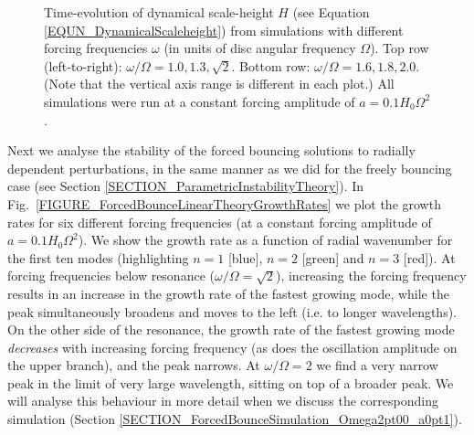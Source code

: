 \documentclass[fleqn,usenatbib]{mnras}
\begin{document}
\begin{figure}
\caption{Time-evolution of dynamical scale-height $H$ (see Equation \ref{EQUN_DynamicalScaleheight}) from simulations with different forcing frequencies $\omega$ (in units of disc angular frequency $\Omega$). Top row (left-to-right): $\omega/\Omega = 1.0, 1.3, \sqrt{2}$. Bottom row: $\omega/\Omega = 1.6, 1.8, 2.0$. (Note that the vertical axis range is different in each plot.) All simulations were run at a constant forcing amplitude of $a = 0.1 H_0\Omega^2$.}
\label{FIGURE_ForcedBounceDynamicalHForcingFrequencies  }
\end{figure}

Next we analyse the stability of the forced bouncing solutions to radially dependent perturbations, in the same manner as we did for the freely bouncing case (see Section \ref{SECTION_ParametricInstabilityTheory}). In Fig.~\ref{FIGURE_ForcedBounceLinearTheoryGrowthRates} we plot the growth rates for six different forcing frequencies (at a constant forcing amplitude of $a=0.1 H_0\Omega^2$). We show the growth rate as a function of radial wavenumber for the first ten modes (highlighting $n=1$ [blue], $n=2$ [green] and $n=3$ [red]). At forcing frequencies below resonance ($\omega/\Omega = \sqrt{2}$), increasing the forcing frequency results in an increase in the growth rate of the fastest growing mode, while the peak simultaneously broadens and moves to the left (i.e. to longer wavelengths). On the other side of the resonance, the growth rate of the fastest growing mode \textit{decreases} with increasing forcing frequency (as does the oscillation amplitude on the upper branch), and the peak narrows. At $\omega/\Omega = 2$ we find a very narrow peak in the limit of very large wavelength, sitting on top of a broader peak. We will analyse this behaviour in more detail when we discuss the corresponding simulation (Section \ref{SECTION_ForcedBounceSimulation_Omega2pt00_a0pt1}).
\end{document}
